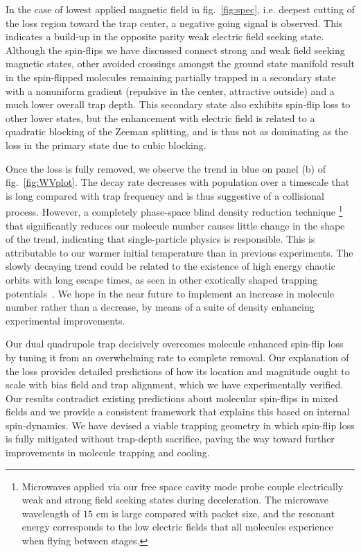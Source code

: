 \documentclass[%
 reprint,
groupedaddress,
 amsmath,amssymb,
 aps,
prl,
]{revtex4-1}
\begin{document}
In the case of lowest applied magnetic field in fig.~\ref{fig:spec}, i.e. deepest cutting of the loss region toward the trap center, a negative going signal is observed. This indicates a build-up in the opposite parity weak electric field seeking state. Although the spin-flips we have discussed connect strong and weak field seeking magnetic states, other avoided crossings amongst the ground state manifold result in the spin-flipped molecules remaining partially trapped in a secondary state with a nonuniform gradient (repulsive in the center, attractive outside) and a much lower overall trap depth. This secondary state also exhibits spin-flip loss to other lower states, but the enhancement with electric field is related to a quadratic blocking of the Zeeman splitting, and is thus not as dominating as the loss in the primary state due to cubic blocking.

Once the loss is fully removed, we observe the trend in blue on panel (b) of fig.~\ref{fig:WVplot}. The decay rate decreases with population over a timescale that is long compared with trap frequency and is thus suggestive of a collisional process. However, a completely phase-space blind density reduction technique \footnote{Microwaves applied via our free space cavity mode probe couple electrically weak and strong field seeking states during deceleration. The microwave wavelength of $15\text{ cm}$ is large compared with packet size, and the resonant energy corresponds to the low electric fields that all molecules experience when flying between stages.} that significantly reduces our molecule number causes little change in the shape of the trend, indicating that single-particle physics is responsible. This is attributable to our warmer initial temperature than in previous experiments. The slowly decaying trend could be related to the existence of high energy chaotic orbits with long escape times, as seen in other exotically shaped trapping potentials~\cite{Gonzalez-Ferez2014}. We hope in the near future to implement an increase in molecule number rather than a decrease, by means of a suite of density enhancing experimental improvements.

Our dual quadrupole trap decisively overcomes molecule enhanced spin-flip loss by tuning it from an overwhelming rate to complete removal. Our explanation of the loss provides detailed predictions of how its location and magnitude ought to scale with bias field and trap alignment, which we have experimentally verified. Our results contradict existing predictions about molecular spin-flips in mixed fields and we provide a consistent framework that explains this based on internal spin-dynamics. We have devised a viable trapping geometry in which spin-flip loss is fully mitigated without trap-depth sacrifice, paving the way toward further improvements in molecule trapping and cooling.
\end{document}
